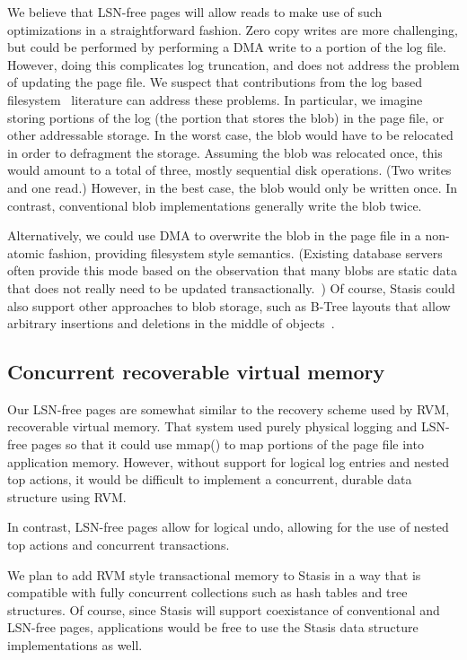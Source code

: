 \documentclass[letterpaper,twocolumn,10pt]{article}
\newcommand{\yad}{Stasis\xspace}
\begin{document}
We believe that LSN-free pages will allow reads to make use of such
optimizations in a straightforward fashion.  Zero copy writes are more challenging, but could be
performed by performing a DMA write to a portion of the log file.
However, doing this complicates log truncation, and does not address
the problem of updating the page file.  We suspect that contributions
from the log based filesystem~\cite{lfs} literature can address these problems.
In particular, we imagine storing 
portions of the log (the portion that stores the blob) in the 
page file, or other addressable storage.  In the worst case, 
the blob would have to be relocated in order to defragment the 
storage.  Assuming the blob was relocated once, this would amount 
to a total of three, mostly sequential disk operations.  (Two 
writes and one read.)  However, in the best case, the blob would only be written once.
In contrast, conventional blob implementations generally write the blob twice. 

Alternatively, we could use DMA to overwrite the blob in the page file
in a non-atomic fashion, providing filesystem style semantics.
(Existing database servers often provide this mode based on the
observation that many blobs are static data that does not really need
to be updated transactionally.~\cite{sqlserver}) Of course, \yad could
also support other approaches to blob storage, such as B-Tree layouts
that allow arbitrary insertions and deletions in the middle of
objects~\cite{esm}.

\subsection{Concurrent recoverable virtual memory}

Our LSN-free pages are somewhat similar to the recovery scheme used by
RVM, recoverable virtual memory.  That system used purely physical
logging and LSN-free pages so that it could use mmap() to map portions
of the page file into application memory\cite{lrvm}.  However, without
support for logical log entries and nested top actions, it would be
difficult to implement a concurrent, durable data structure using RVM.

In contrast, LSN-free pages allow for logical undo, allowing for the
use of nested top actions and concurrent transactions.

We plan to add RVM style transactional memory to \yad in a way that is
compatible with fully concurrent collections such as hash tables and
tree structures.  Of course, since \yad will support coexistance of
conventional and LSN-free pages, applications would be free to use the
\yad data structure implementations as well.
\end{document}
